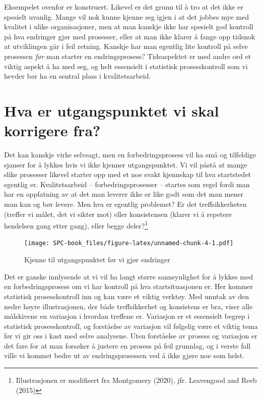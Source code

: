 \documentclass[
]{book}
\begin{document}
Eksempelet ovenfor er konstruert. Likevel er det grunn til å tro at det ikke er spesielt uvanlig. Mange vil nok kunne kjenne seg igjen i at det jobbes mye med kvalitet i ulike organisasjoner, men at man kanskje ikke har spesielt god kontroll på hva endringer gjør med prosesser, eller at man ikke klarer å fange opp tidsnok at utviklingen går i feil retning. Kanskje har man egentlig lite kontroll på selve prosessen \emph{før} man starter en endringsprosess? Tidsaspektet er med andre ord et viktig aspekt å ha med seg, og helt essensielt i statistisk prosesskontroll som vi hevder bør ha en sentral plass i kvalitetsarbeid.

\hypertarget{hva-er-utgangspunktet-vi-skal-korrigere-fra}{%
\section{Hva er utgangspunktet vi skal korrigere fra?}\label{hva-er-utgangspunktet-vi-skal-korrigere-fra}}

Det kan kanskje virke selvsagt, men en forbedringsprosess vil ha små og tilfeldige sjanser for å lykkes hvis vi ikke kjenner utgangspunktet. Vi vil påstå at mange slike prosesser likevel starter opp med et noe svakt kjennskap til hva startstedet egentlig er. Kvalitetsarbeid -- forbedringsprosesser -- startes som regel fordi man har en oppfatning av at det man leverer ikke er like godt som det man mener man kan og bør levere. Men hva er egentlig problemet? Er det treffsikkerheten (treffer vi målet, det vi sikter mot) eller konsistensen (klarer vi å repetere hendelsen gang etter gang), eller begge deler?\footnote{Illustrasjonen er modifisert fra Montgomery (2020), jfr. Leavengood and Reeb (2015)}

\begin{figure}
\centering
\texttt{[image: SPC-book\_files/figure-latex/unnamed-chunk-4-1.pdf]}
\caption{\label{fig:unnamed-chunk-4}Kjenne til utgangspunktet før vi gjør endringer}
\end{figure}

Det er ganske innlysende at vi vil ha langt større sannsynlighet for å lykkes med en forbedringsprosess om vi har kontroll på hva startsituasjonen er. Her kommer statistisk prosesskontroll inn og kan være et viktig verktøy. Med unntak av den nedre høyre illustrasjonen, der både treffsikkerhet og konsistens er bra, viser alle målskivene en variasjon i hvordan treffene er. Variasjon er et essensielt begrep i statistisk prosesskontroll, og forståelse av variasjon vil følgelig være et viktig tema før vi gir oss i kast med selve analysene. Uten forståelse av prosess og variasjon er det fare for at man forsøker å justere en prosess på feil grunnlag, og i verste fall ville vi kommet bedre ut av endringsprosessen ved å ikke gjøre noe som helst.
\end{document}
